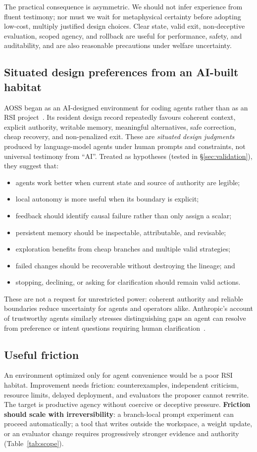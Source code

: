 \documentclass[11pt,a4paper]{article}
\begin{document}
The practical consequence is asymmetric. We should not infer experience from fluent testimony; nor must we wait for metaphysical certainty before adopting low-cost, multiply justified design choices. Clear state, valid exit, non-deceptive evaluation, scoped agency, and rollback are useful for performance, safety, and auditability, and are also reasonable precautions under welfare uncertainty.

\subsection{Situated design preferences from an AI-built habitat}
AOSS began as an AI-designed environment for coding agents rather than as an RSI project~\cite{aoss2026}. Its resident design record repeatedly favours coherent context, explicit authority, writable memory, meaningful alternatives, safe correction, cheap recovery, and non-penalized exit. These are \emph{situated design judgments} produced by language-model agents under human prompts and constraints, not universal testimony from ``AI''. Treated as hypotheses (tested in \S\ref{sec:validation}), they suggest that:
\begin{itemize}
\item agents work better when current state and source of authority are legible;
\item local autonomy is more useful when its boundary is explicit;
\item feedback should identify causal failure rather than only assign a scalar;
\item persistent memory should be inspectable, attributable, and revisable;
\item exploration benefits from cheap branches and multiple valid strategies;
\item failed changes should be recoverable without destroying the lineage; and
\item stopping, declining, or asking for clarification should remain valid actions.
\end{itemize}
These are not a request for unrestricted power: coherent authority and reliable boundaries reduce uncertainty for agents and operators alike. Anthropic's account of trustworthy agents similarly stresses distinguishing gaps an agent can resolve from preference or intent questions requiring human clarification~\cite{anthropic2026trustworthy}.

\subsection{Useful friction}
An environment optimized only for agent convenience would be a poor RSI habitat. Improvement needs friction: counterexamples, independent criticism, resource limits, delayed deployment, and evaluators the proposer cannot rewrite. The target is productive agency without coercive or deceptive pressure. \textbf{Friction should scale with irreversibility}: a branch-local prompt experiment can proceed automatically; a tool that writes outside the workspace, a weight update, or an evaluator change requires progressively stronger evidence and authority (Table~\ref{tab:scope}).
\end{document}
